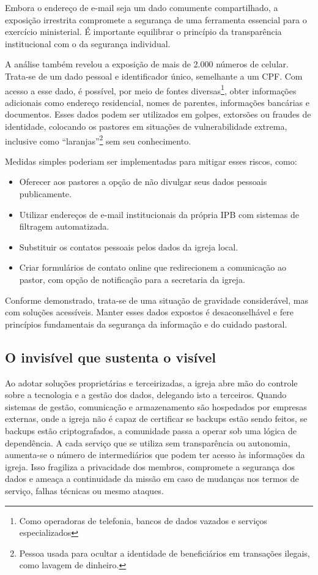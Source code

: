 Embora o endereço de e-mail seja um dado comumente compartilhado, a exposição irrestrita compromete a segurança de uma ferramenta essencial para o exercício ministerial. É importante equilibrar o princípio da transparência institucional com o da segurança individual.

A análise também revelou a exposição de mais de 2.000 números de celular. Trata-se de um dado pessoal e identificador único, semelhante a um CPF. Com acesso a esse dado, é possível, por meio de fontes diversas\footnote{Como operadoras de telefonia, bancos de dados vazados e serviços especializados}, obter informações adicionais como endereço residencial, nomes de parentes, informações bancárias e documentos. Esses dados podem ser utilizados em golpes, extorsões ou fraudes de identidade, colocando os pastores em situações de vulnerabilidade extrema, inclusive como ``laranjas''\footnote{Pessoa usada para ocultar a identidade de beneficiários em transações ilegais, como lavagem de dinheiro.\cite{wiki_laranja}} sem seu conhecimento.

Medidas simples poderiam ser implementadas para mitigar esses riscos, como:

\begin{itemize}
    \item Oferecer aos pastores a opção de não divulgar seus dados pessoais publicamente.
    \item Utilizar endereços de e-mail institucionais da própria IPB com sistemas de filtragem automatizada.
    \item Substituir os contatos pessoais pelos dados da igreja local.
    \item Criar formulários de contato online que redirecionem a comunicação ao pastor, com opção de notificação para a secretaria da igreja.
\end{itemize}

Conforme demonstrado, trata-se de uma situação de gravidade considerável, mas com soluções acessíveis. Manter esses dados expostos é desaconselhável e fere princípios fundamentais da segurança da informação e do cuidado pastoral.


\subsection{O invisível que sustenta o visível}

Ao adotar soluções proprietárias e terceirizadas, a igreja abre mão do controle sobre a tecnologia e a gestão dos dados, delegando isto a terceiros. Quando sistemas de gestão, comunicação e armazenamento são hospedados por empresas externas, onde a igreja não é capaz de certificar se backups estão sendo feitos, se backups estão criptografados, a comunidade passa a operar sob uma lógica de dependência. A cada serviço que se utiliza sem transparência ou autonomia, aumenta-se o número de intermediários que podem ter acesso às informações da igreja. Isso fragiliza a privacidade dos membros, compromete a segurança dos dados e ameaça a continuidade da missão em caso de mudanças nos termos de serviço, falhas técnicas ou mesmo ataques.

